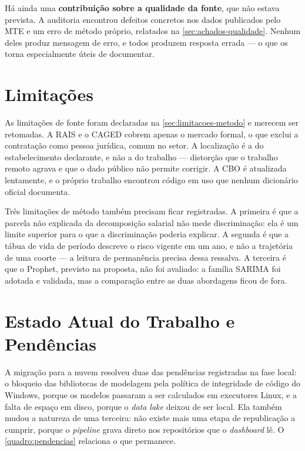Há ainda uma \textbf{contribuição sobre a qualidade da fonte}, que não estava prevista. A auditoria encontrou defeitos concretos nos dados publicados pelo MTE e um erro de método próprio, relatados na \autoref{sec:achados-qualidade}. Nenhum deles produz mensagem de erro, e todos produzem resposta errada --- o que os torna especialmente úteis de documentar.

\section{Limitações}

As limitações de fonte foram declaradas na \autoref{sec:limitacoes-metodo} e merecem ser retomadas. A RAIS e o CAGED cobrem apenas o mercado formal, o que exclui a contratação como pessoa jurídica, comum no setor. A localização é a do estabelecimento declarante, e não a do trabalho --- distorção que o trabalho remoto agrava e que o dado público não permite corrigir. A CBO é atualizada lentamente, e o próprio trabalho encontrou código em uso que nenhum dicionário oficial documenta.

Três limitações de método também precisam ficar registradas. A primeira é que a parcela não explicada da decomposição salarial não mede discriminação: ela é um limite superior para o que a discriminação poderia explicar. A segunda é que a tábua de vida de período descreve o risco vigente em um ano, e não a trajetória de uma coorte --- a leitura de permanência precisa dessa ressalva. A terceira é que o Prophet, previsto na proposta, não foi avaliado: a família SARIMA foi adotada e validada, mas a comparação entre as duas abordagens ficou de fora.

\section{Estado Atual do Trabalho e Pendências}
\label{sec:pendencias}

A migração para a nuvem resolveu duas das pendências registradas na fase local: o bloqueio das bibliotecas de modelagem pela política de integridade de código do Windows, porque os modelos passaram a ser calculados em executores Linux, e a falta de espaço em disco, porque o \textit{data lake} deixou de ser local. Ela também mudou a natureza de uma terceira: não existe mais uma etapa de republicação a cumprir, porque o \textit{pipeline} grava direto nos repositórios que o \textit{dashboard} lê. O \autoref{quadro:pendencias} relaciona o que permanece.

